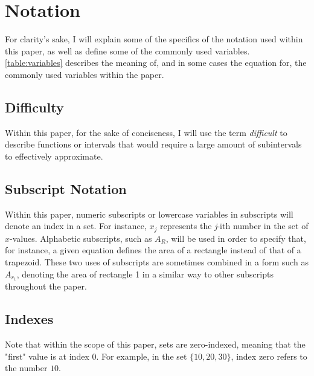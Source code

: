 \documentclass{paper}
\begin{document}
\section{Notation}
\label{sec:notation}
For clarity's sake, I will explain some of the specifics of the notation used within this paper, as well as define some of the commonly used variables.
\cref{table:variables} describes the meaning of, and in some cases the equation for, the commonly used variables within the paper.

\subsection{Difficulty}
Within this paper, for the sake of conciseness, I will use the term \emph{difficult} to describe functions or intervals that would require a large amount of subintervals to effectively approximate.

\subsection{Subscript Notation}
Within this paper, numeric subscripts or lowercase variables in subscripts will denote an index in a set.
For instance, \(x_j\) represents the \emph{j}-ith number in the set of \(x\)-values.
Alphabetic subscripts, such as \(A_R\), will be used in order to specify that, for instance, a given equation defines the area of a rectangle instead of that of a trapezoid.
These two uses of subscripts are sometimes combined in a form such as \(A_{r_1}\), denoting the area of rectangle 1 in a similar way to other subscripts throughout the paper.

\subsection{Indexes}
Note that within the scope of this paper, sets are zero-indexed, meaning that the "first" value is at index \(0\).
For example, in the set \(\{10, 20, 30\}\), index zero refers to the number \(10\).
\end{document}
